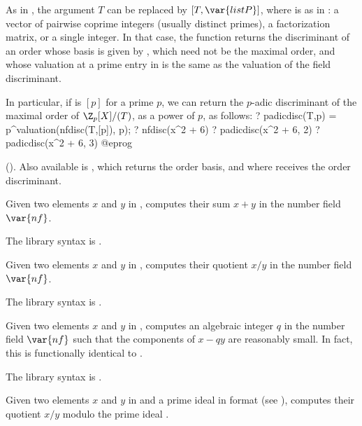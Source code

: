 
As in , the argument $T$ can be replaced by $[T,\var{listP}]$,
where  is as in : a vector of
pairwise coprime integers (usually distinct primes), a factorization matrix,
or a single integer. In that case, the function returns the discriminant of
an order whose basis is given by , which need not be
the maximal order, and whose valuation at a prime entry in  is the
same as the valuation of the field discriminant.

In particular, if  is $[p]$ for a prime $p$, we can
return the $p$-adic discriminant of the maximal order of $\Z_p[X]/(T)$,
as a power of $p$, as follows:
\bprog
? padicdisc(T,p) = p^valuation(nfdisc(T,[p]), p);
? nfdisc(x^2 + 6)
? padicdisc(x^2 + 6, 2)
? padicdisc(x^2 + 6, 3)
@eprog

 (). Also available is
, which returns the order
basis, and where  receives the order discriminant.

\label{se:nfeltadd}
Given two elements $x$ and $y$ in
, computes their sum $x+y$ in the number field $\var{nf}$.

The library syntax is .

\label{se:nfeltdiv}
Given two elements $x$ and $y$ in
, computes their quotient $x/y$ in the number field $\var{nf}$.

The library syntax is .

\label{se:nfeltdiveuc}
Given two elements $x$ and $y$ in
, computes an algebraic integer $q$ in the number field $\var{nf}$
such that the components of $x-qy$ are reasonably small. In fact, this is
functionally identical to .

The library syntax is .

\label{se:nfeltdivmodpr}
Given two elements $x$
and $y$ in  and  a prime ideal in  format (see
), computes their quotient $x / y$ modulo the prime ideal
.


